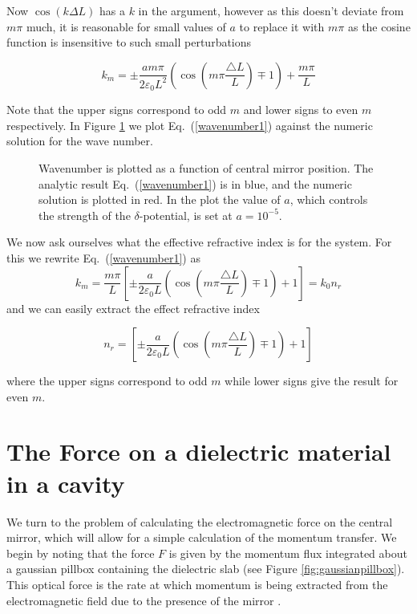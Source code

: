\documentclass[twocolumn,english,pra,aps,superscriptaddress,floatfix]{revtex4-1}
\begin{document}
Now $\cos(k\Delta L)$ has a $k$ in the argument, however as this doesn't deviate from $m\pi$ much, it is reasonable for small values of $a$
to replace it with $m\pi$ as the cosine function is insensitive to such small perturbations 

\begin{equation}
k_{m}=\pm\frac{a m\pi}{2\varepsilon_{0}L^{2}}\left(\cos(m\pi\frac{\triangle L}{L})\mp1\right)+\frac{m\pi}{L}
\label{wavenumber1}
\end{equation}

Note that the upper signs correspond to odd $m$ and lower signs to
even $m$ respectively.  In Figure \ref{fig:wavenumberapprox} we plot Eq.\ (\ref{wavenumber1}) against the numeric solution for the wave number. 



\begin{figure}
\caption{Wavenumber is plotted as a function of central mirror position.  The analytic result Eq.\ (\ref{wavenumber1}) is in blue, and the numeric solution is plotted in red.  In the plot the value of $a$, which controls the strength of the $\delta$-potential, is set at $a=10^{-5}$. }
\label{fig:wavenumberapprox}
\end{figure}

We now ask ourselves what the effective refractive index is for the system. For this we rewrite Eq.\ (\ref{wavenumber1}) as
\begin{equation}
k_{m}=\frac{m\pi}{L}\left[\pm\frac{a}{2\varepsilon_{0}L}\left(\cos(m\pi\frac{\triangle L}{L})\mp1\right)+1\right]=k_{0} n_{r}
\label{wavenumber2}
\end{equation}
and we can easily extract the effect refractive index

\begin{equation}
n_{r}=\left[\pm\frac{a}{2\varepsilon_{0}L}\left(\cos(m\pi\frac{\triangle L}{L})\mp1\right)+1\right]
\label{refractiveindex}
\end{equation}

where the upper signs correspond to odd $m$ while lower signs give the result for even $m$.  

\section{The Force on a dielectric material in a cavity}
\label{sec:force}
We turn to the problem of calculating the electromagnetic force on the central mirror, which will allow for a simple calculation of the momentum transfer. We begin by noting that the force $F$ is given by the momentum flux integrated about a gaussian pillbox containing the dielectric slab \cite{domokos08} (see Figure \ref{fig:gaussianpillbox}).  This optical force is the rate at which momentum is being extracted from the electromagnetic field due to the presence of the mirror  \cite{griffiths}.  
\end{document}
